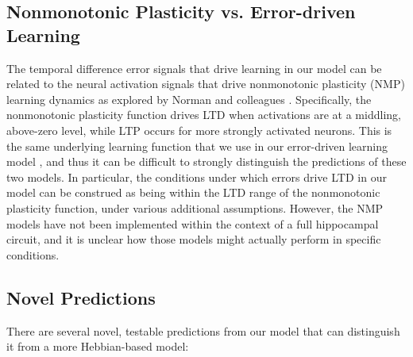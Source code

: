 \documentclass[10pt,letterpaper]{article}
\begin{document}
\subsection*{Nonmonotonic Plasticity vs. Error-driven Learning}

The temporal difference error signals that drive learning in our model can be related to the neural activation signals that drive nonmonotonic plasticity (NMP) learning dynamics as explored by Norman and colleagues \cite{RitvoTurk-BrowneNorman19}.  Specifically, the nonmonotonic plasticity function drives LTD when activations are at a middling, above-zero level, while LTP occurs for more strongly activated neurons.  This is the same underlying learning function that we use in our error-driven learning model \cite{OReillyMunakataFrankEtAl12}, and thus it can be difficult to strongly distinguish the predictions of these two models.  In particular, the conditions under which errors drive LTD in our model can be construed as being within the LTD range of the nonmonotonic plasticity function, under various additional assumptions.  However, the NMP models have not been implemented within the context of a full hippocampal circuit, and it is unclear how those models might actually perform in specific conditions.

\subsection*{Novel Predictions}

There are several novel, testable predictions from our model that can distinguish it from a more Hebbian-based model:
\end{document}
